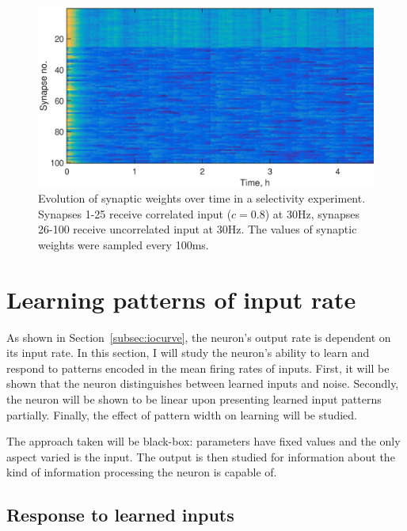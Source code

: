 \documentclass[a4paper,12pt]{report}
\theoremstyle{definition}
\begin{document}
\begin{figure}[h]
    \includegraphics[width=\textwidth]{figures/valid_selectivity_correlation.eps}
    \caption{Evolution of synaptic weights over time in a selectivity experiment. Synapses 1-25 receive correlated input ($c=0.8$) at 30Hz, synapses 26-100 receive uncorrelated input at 30Hz. The values of synaptic weights were sampled every 100ms.}
    \label{fig:selectivity_correlation}
\end{figure}









\section{Learning patterns of input rate}

As shown in Section~\ref{subsec:iocurve}, the neuron's output rate is dependent on its input rate. In this section, I will study the neuron's ability to learn and respond to patterns encoded in the mean firing rates of inputs. First, it will be shown that the neuron distinguishes between learned inputs and noise. Secondly, the neuron will be shown to be linear upon presenting learned input patterns partially. Finally, the effect of pattern width on learning will be studied.

The approach taken will be black-box: parameters have fixed values and the only aspect varied is the input. The output is then studied for information about the kind of information processing the neuron is capable of.

\subsection{Response to learned inputs}
\label{subsec:learnedinputs}
\end{document}
